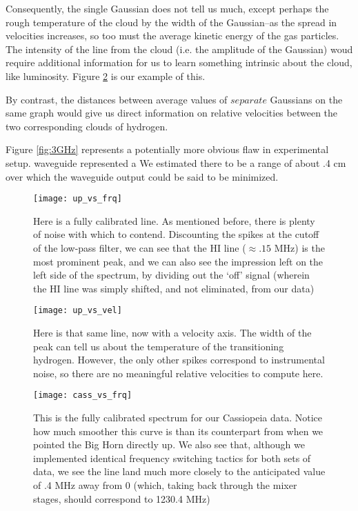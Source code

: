 \documentclass[12pt]{article}
\begin{document}
Consequently, the single Gaussian does not tell us much, except perhaps the rough temperature of the cloud by the width of the Gaussian--as the spread in velocities increases, so too must the average kinetic energy of the gas particles. The intensity of the line from the cloud (i.e. the amplitude of the Gaussian) woud require additional information for us to learn something intrinsic about the cloud, like luminosity. Figure \ref{fig:up_vs_vel} is our example of this.

By contrast, the distances between average values of $separate$ Gaussians on the same graph would give us direct information on relative velocities between the two corresponding clouds of hydrogen. 

Figure \ref{fig:3GHz} represents a potentially more obvious flaw in experimental setup.  waveguide represented a We estimated there to be a range of about .4 cm over which the waveguide output could be said to be minimized. 

\begin{figure}
	\centering
	\texttt{[image: up\_vs\_frq]}
	\caption{Here is a fully calibrated line. As mentioned before, there is plenty of noise with which to contend. Discounting the spikes at the cutoff of the low-pass filter, we can see that the HI line ($\approx .15$ MHz) is the most prominent peak, and we can also see the impression left on the left side of the spectrum, by dividing out the `off' signal (wherein the HI line was simply shifted, and not eliminated, from our data)}
	\label{fig:up_vs_frq}
\end{figure}

\begin{figure}
	\centering
	\texttt{[image: up\_vs\_vel]}
	\caption{Here is that same line, now with a velocity axis. The width of the peak can tell us about the temperature of the transitioning hydrogen. However, the only other spikes correspond to instrumental noise, so there are no meaningful relative velocities to compute here.}
	\label{fig:up_vs_vel}
\end{figure}

\begin{figure}
\centering
	\texttt{[image: cass\_vs\_frq]}
	\caption{This is the fully calibrated spectrum for our Cassiopeia data. Notice how much smoother this curve is than its counterpart from when we pointed the Big Horn directly up. We also see that, although we implemented identical frequency switching tactics for both sets of data, we see the line land much more closely to the anticipated value of .4 MHz away from 0 (which, taking back through the mixer stages, should correspond to 1230.4 MHz)}
	\label{fig:cass_vs_freq}
\end{figure}
\end{document}
